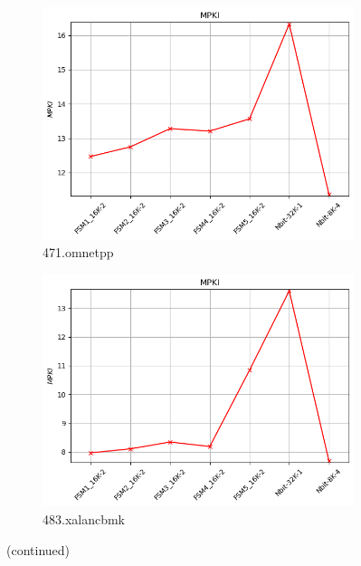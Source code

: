 \documentclass{article}
\begin{document}
\begin{figure}
    \vspace{0.5cm} %

    \begin{subfigure}[b]{0.45\textwidth}
        \includegraphics[width=\textwidth]{figures/5_3_c/471.omnetpp.cslab_branch_preds_ref.out.png}
        \caption{471.omnetpp}
        \label{fig:plot47}
    \end{subfigure}
    \hfill
    \begin{subfigure}[b]{0.45\textwidth}
        \includegraphics[width=\textwidth]{figures/5_3_c/483.xalancbmk.cslab_branch_preds_ref.out.png}
        \caption{483.xalancbmk}
        \label{fig:plot48}        
    \end{subfigure}
    \vspace{0.5cm}

    \caption{(continued)}
    \label{fig:32K_part3}
\end{figure}
\end{document}
